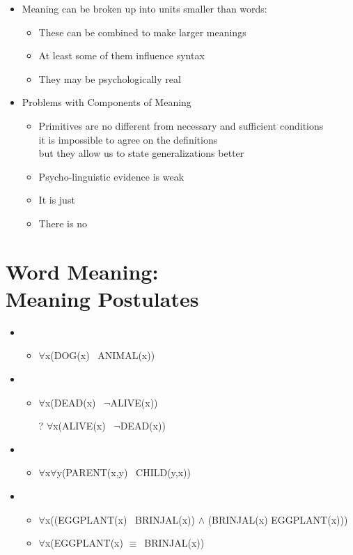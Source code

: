 \documentclass[headrule,footrule]{foils}
\begin{document}
\begin{itemize}
\item Meaning can be broken up into units smaller than words:   
  \begin{itemize}
  \item These can be combined to make larger meanings
  \item At least some of them influence syntax
  \item They may be psychologically real
  \end{itemize}
\item Problems with Components of Meaning
  \begin{itemize}
  \item Primitives are no different from necessary and sufficient conditions
    \\ it is impossible to agree on the definitions
    \\ but they allow us to state generalizations better
  \item Psycho-linguistic evidence is weak
  \item It is just 
  \item There is no 
  \end{itemize}
\end{itemize}



\section{Word Meaning: \\ Meaning Postulates}

\begin{itemize}
\item {}
  \begin{itemize}
  \item $\forall$x(DOG(x) \into\ ANIMAL(x))
  \end{itemize}
\item {}
  \begin{itemize}
  \item $\forall$x(DEAD(x) \into\ $\neg$ALIVE(x))
  \item[?] $\forall$x(ALIVE(x) \into\ $\neg$DEAD(x))
  \end{itemize}
\item {}
  \begin{itemize}
  \item $\forall$x$\forall$y(PARENT(x,y) \into\ CHILD(y,x))
  \end{itemize}
\item {}
  \begin{itemize}
  \item $\forall$x((EGGPLANT(x) \into\ BRINJAL(x)) $\wedge$ 
    (BRINJAL(x) \into EGGPLANT(x)))
  \item $\forall$x(EGGPLANT(x) $\equiv$\ BRINJAL(x))
  \end{itemize}
\end{itemize}
\end{document}
